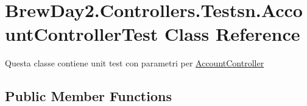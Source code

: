 \hypertarget{class_brew_day2_1_1_controllers_1_1_testsn_1_1_account_controller_test}{}\section{Brew\+Day2.\+Controllers.\+Testsn.\+Account\+Controller\+Test Class Reference}
\label{class_brew_day2_1_1_controllers_1_1_testsn_1_1_account_controller_test}


Questa classe contiene unit test con parametri per \mbox{\hyperlink{class_brew_day2_1_1_controllers_1_1_account_controller}{Account\+Controller}} 


\subsection*{Public Member Functions}
